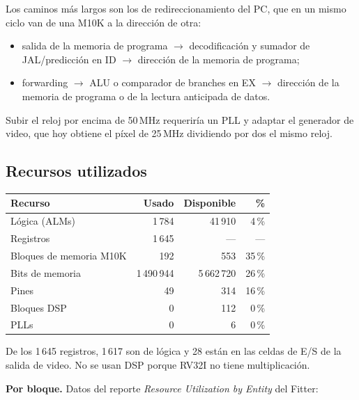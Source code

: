 \documentclass[11pt,a4paper]{article}
\begin{document}
Los caminos más largos son los de redireccionamiento del PC, que en un mismo ciclo van de una M10K a la dirección de otra:
\begin{itemize}
\item salida de la memoria de programa $\to$ decodificación y sumador de JAL/predicción en ID $\to$ dirección de la memoria de programa;
\item forwarding $\to$ ALU o comparador de branches en EX $\to$ dirección de la memoria de programa o de la lectura anticipada de datos.
\end{itemize}
Subir el reloj por encima de 50\,MHz requeriría un PLL y adaptar el generador de video, que hoy obtiene el píxel de 25\,MHz dividiendo por dos el mismo reloj.

\subsection{Recursos utilizados}

\begin{center}
\begin{tabular}{lrrr}
\toprule
Recurso & Usado & Disponible & \% \\
\midrule
Lógica (ALMs) & 1\,784 & 41\,910 & 4\,\% \\
Registros & 1\,645 & --- & --- \\
Bloques de memoria M10K & 192 & 553 & 35\,\% \\
Bits de memoria & 1\,490\,944 & 5\,662\,720 & 26\,\% \\
Pines & 49 & 314 & 16\,\% \\
Bloques DSP & 0 & 112 & 0\,\% \\
PLLs & 0 & 6 & 0\,\% \\
\bottomrule
\end{tabular}
\end{center}

De los 1\,645 registros, 1\,617 son de lógica y 28 están en las celdas de E/S de la salida de video. No se usan DSP porque RV32I no tiene multiplicación.

\textbf{Por bloque.} Datos del reporte \emph{Resource Utilization by Entity} del Fitter:
\end{document}
